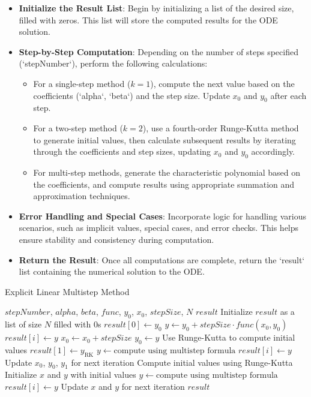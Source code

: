 \documentclass[a4paper, twoside]{report} %
\begin{document}
	\begin{itemize}
		\item \textbf{Initialize the Result List}: Begin by initializing a list of the desired size, filled with zeros. This list will store the computed results for the ODE solution.

		\item \textbf{Step-by-Step Computation}: Depending on the number of steps specified (`stepNumber`), perform the following calculations:
		\begin{itemize}
			\item For a single-step method (\(k = 1\)), compute the next value based on the coefficients (`alpha`, `beta`) and the step size. Update \(x_0\) and \(y_0\) after each step.
			\item For a two-step method (\(k = 2\)), use a fourth-order Runge-Kutta method to generate initial values, then calculate subsequent results by iterating through the coefficients and step sizes, updating \(x_0\) and \(y_0\) accordingly.
			\item For multi-step methods, generate the characteristic polynomial based on the coefficients, and compute results using appropriate summation and approximation techniques.
		\end{itemize}

		\item \textbf{Error Handling and Special Cases}: Incorporate logic for handling various scenarios, such as implicit values, special cases, and error checks. This helps ensure stability and consistency during computation.

		\item \textbf{Return the Result}: Once all computations are complete, return the `result` list containing the numerical solution to the ODE.
	\end{itemize}


	\begin{algorithm}
		\caption{Explicit Linear Multistep Method}
		\begin{algorithmic}[1]
			\REQUIRE $stepNumber$, $alpha$, $beta$, $func$, $y_0$, $x_0$, $stepSize$, $N$
			\ENSURE $result$
			\STATE Initialize $result$ as a list of size $N$ filled with 0s
			\STATE $result[0] \gets y_0$
			\STATE $y \gets y_0 + stepSize \cdot func(x_0, y_0)$
			\STATE $result[i] \gets y$
			\STATE $x_0 \gets x_0 + stepSize$
			\STATE $y_0 \gets y$
			\ENDFOR
			\STATE Use Runge-Kutta to compute initial values
			\STATE $result[1] \gets y_{\text{RK}}$
			\STATE $y \gets \text{compute using multistep formula}$
			\STATE $result[i] \gets y$
			\STATE Update $x_0$, $y_0$, $y_1$ for next iteration
			\ENDFOR
			\ELSE
			\STATE Compute initial values using Runge-Kutta
			\STATE Initialize $x$ and $y$ with initial values
			\STATE $y \gets \text{compute using multistep formula}$
			\STATE $result[i] \gets y$
			\STATE Update $x$ and $y$ for next iteration
			\ENDFOR
			\ENDIF
			\RETURN $result$
		\end{algorithmic}
	\end{algorithm}
\end{document}
